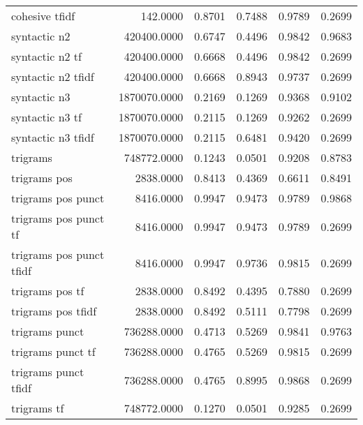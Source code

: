 \begin{tabular}{lrrrrr}
cohesive tfidf             &     142.0000 & 0.8701 &       0.7488 &         0.9789 &               0.2699 \\
syntactic n2               &  420400.0000 & 0.6747 &       0.4496 &         0.9842 &               0.9683 \\
syntactic n2 tf            &  420400.0000 & 0.6668 &       0.4496 &         0.9842 &               0.2699 \\
syntactic n2 tfidf         &  420400.0000 & 0.6668 &       0.8943 &         0.9737 &               0.2699 \\
syntactic n3               & 1870070.0000 & 0.2169 &       0.1269 &         0.9368 &               0.9102 \\
syntactic n3 tf            & 1870070.0000 & 0.2115 &       0.1269 &         0.9262 &               0.2699 \\
syntactic n3 tfidf         & 1870070.0000 & 0.2115 &       0.6481 &         0.9420 &               0.2699 \\
trigrams                   &  748772.0000 & 0.1243 &       0.0501 &         0.9208 &               0.8783 \\
trigrams pos               &    2838.0000 & 0.8413 &       0.4369 &         0.6611 &               0.8491 \\
trigrams pos punct         &    8416.0000 & 0.9947 &       0.9473 &         0.9789 &               0.9868 \\
trigrams pos punct tf      &    8416.0000 & 0.9947 &       0.9473 &         0.9789 &               0.2699 \\
trigrams pos punct tfidf   &    8416.0000 & 0.9947 &       0.9736 &         0.9815 &               0.2699 \\
trigrams pos tf            &    2838.0000 & 0.8492 &       0.4395 &         0.7880 &               0.2699 \\
trigrams pos tfidf         &    2838.0000 & 0.8492 &       0.5111 &         0.7798 &               0.2699 \\
trigrams punct             &  736288.0000 & 0.4713 &       0.5269 &         0.9841 &               0.9763 \\
trigrams punct tf          &  736288.0000 & 0.4765 &       0.5269 &         0.9815 &               0.2699 \\
trigrams punct tfidf       &  736288.0000 & 0.4765 &       0.8995 &         0.9868 &               0.2699 \\
trigrams tf                &  748772.0000 & 0.1270 &       0.0501 &         0.9285 &               0.2699 \\

\end{tabular}
